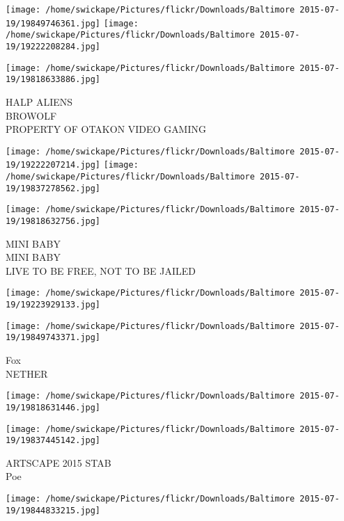 \documentclass[10pt,letterpaper]{article}
\begin{document}
\texttt{[image: /home/swickape/Pictures/flickr/Downloads/Baltimore 2015-07-19/19849746361.jpg]}
\texttt{[image: /home/swickape/Pictures/flickr/Downloads/Baltimore 2015-07-19/19222208284.jpg]}

\vspace{0.25in}
\texttt{[image: /home/swickape/Pictures/flickr/Downloads/Baltimore 2015-07-19/19818633886.jpg]}

HALP ALIENS\\
BROWOLF\\
PROPERTY OF OTAKON VIDEO GAMING\\
\pagebreak

\texttt{[image: /home/swickape/Pictures/flickr/Downloads/Baltimore 2015-07-19/19222207214.jpg]}
\texttt{[image: /home/swickape/Pictures/flickr/Downloads/Baltimore 2015-07-19/19837278562.jpg]}

\vspace{0.25in}
\texttt{[image: /home/swickape/Pictures/flickr/Downloads/Baltimore 2015-07-19/19818632756.jpg]}

MINI BABY\\
MINI BABY\\
LIVE TO BE FREE, NOT TO BE JAILED\\
\pagebreak

\texttt{[image: /home/swickape/Pictures/flickr/Downloads/Baltimore 2015-07-19/19223929133.jpg]}

\vspace{0.25in}
\texttt{[image: /home/swickape/Pictures/flickr/Downloads/Baltimore 2015-07-19/19849743371.jpg]}

Fox\\
NETHER\\
\pagebreak

\texttt{[image: /home/swickape/Pictures/flickr/Downloads/Baltimore 2015-07-19/19818631446.jpg]}

\vspace{0.25in}
\texttt{[image: /home/swickape/Pictures/flickr/Downloads/Baltimore 2015-07-19/19837445142.jpg]}

ARTSCAPE 2015 STAB\\
Poe\\
\pagebreak

\texttt{[image: /home/swickape/Pictures/flickr/Downloads/Baltimore 2015-07-19/19844833215.jpg]}
\end{document}
